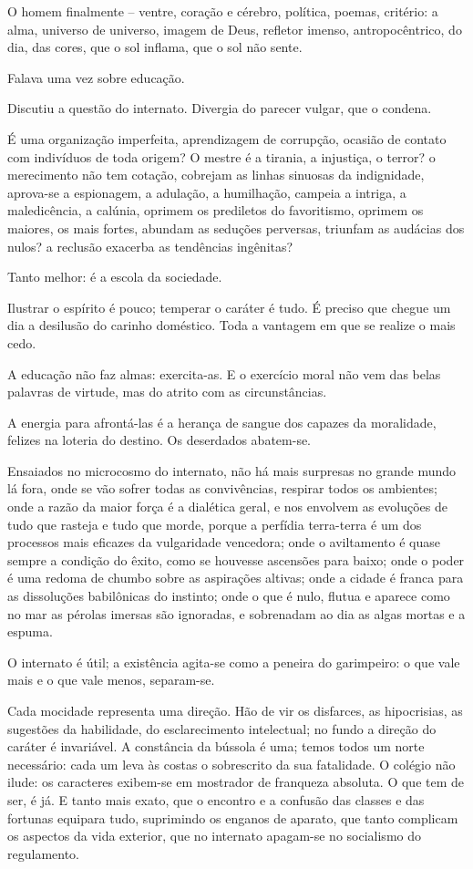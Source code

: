 O homem finalmente -- ventre, coração e
cérebro, política, poemas, critério: a alma, universo de universo,
imagem de Deus, refletor imenso, antropocêntrico, do dia, das cores,
que o sol inflama, que o sol não sente. 

Falava uma vez sobre educação.

Discutiu a questão do internato. Divergia do parecer vulgar, que o
condena.

É uma organização imperfeita, aprendizagem de corrupção,
ocasião de contato com indivíduos de toda origem? O mestre é a tirania,
a injustiça, o terror? o merecimento não tem cotação, cobrejam as
linhas sinuosas da indignidade, aprova{}-se a espionagem, a adulação, a
humilhação, campeia a intriga, a maledicência, a calúnia, oprimem os
prediletos do favoritismo, oprimem os maiores, os mais fortes, abundam
as seduções perversas, triunfam as audácias dos nulos? a reclusão
exacerba as tendências ingênitas? 

Tanto melhor: é a escola da sociedade. 

Ilustrar o espírito é pouco; temperar o caráter é tudo. É
preciso que chegue um dia a desilusão do carinho doméstico. Toda a
vantagem em que se realize o mais cedo. 

A educação não faz almas:
exercita{}-as. E o exercício moral não vem das belas palavras de
virtude, mas do atrito com as circunstâncias. 

A energia para afrontá{}-las é a herança de sangue dos capazes da moralidade, 
felizes na loteria do destino. Os deserdados abatem{}-se. 

Ensaiados no microcosmo do internato, não há mais surpresas no grande mundo lá fora,
onde se vão sofrer todas as convivências, respirar todos os ambientes;
onde a razão da maior força é a dialética geral, e nos envolvem as
evoluções de tudo que rasteja e tudo que morde, porque a perfídia
terra{}-terra é um dos processos mais eficazes da vulgaridade vencedora;
onde o aviltamento é quase sempre a condição do êxito, como se houvesse
ascensões para baixo; onde o poder é uma redoma de chumbo sobre as
aspirações altivas; onde a cidade é franca para as dissoluções
babilônicas do instinto; onde o que é nulo, flutua e aparece como no
mar as pérolas imersas são ignoradas, e sobrenadam ao dia as algas
mortas e a espuma. 

O internato é útil; a existência agita{}-se como a
peneira do garimpeiro: o que vale mais e o que vale menos,
separam{}-se. 

Cada mocidade representa uma direção. Hão de vir os
disfarces, as hipocrisias, as sugestões da habilidade, do
esclarecimento intelectual; no fundo a direção do caráter é invariável.
A constância da bússola é uma; temos todos um norte necessário: cada um
leva às costas o sobrescrito da sua fatalidade. O colégio não ilude: os
caracteres exibem{}-se em mostrador de franqueza absoluta. O que tem de
ser, é já. E tanto mais exato, que o encontro e a confusão das classes
e das fortunas equipara tudo, suprimindo os enganos de aparato, que
tanto complicam os aspectos da vida exterior, que no internato
apagam{}-se no socialismo do regulamento. 

